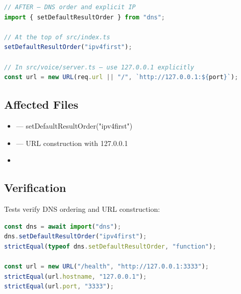 \begin{lstlisting}[language=TypeScript]
// AFTER — DNS order and explicit IP
import { setDefaultResultOrder } from "dns";

// At the top of src/index.ts
setDefaultResultOrder("ipv4first");

// In src/voice/server.ts — use 127.0.0.1 explicitly
const url = new URL(req.url || "/", `http://127.0.0.1:${port}`);
\end{lstlisting}

\subsection*{Affected Files}
\begin{itemize}
    \item {} — setDefaultResultOrder("ipv4first")
    \item {} — URL construction with 127.0.0.1
    \item {}
\end{itemize}

\subsection*{Verification}
Tests verify DNS ordering and URL construction:

\begin{lstlisting}[language=TypeScript]
const dns = await import("dns");
dns.setDefaultResultOrder("ipv4first");
strictEqual(typeof dns.setDefaultResultOrder, "function");

const url = new URL("/health", "http://127.0.0.1:3333");
strictEqual(url.hostname, "127.0.0.1");
strictEqual(url.port, "3333");
\end{lstlisting}
